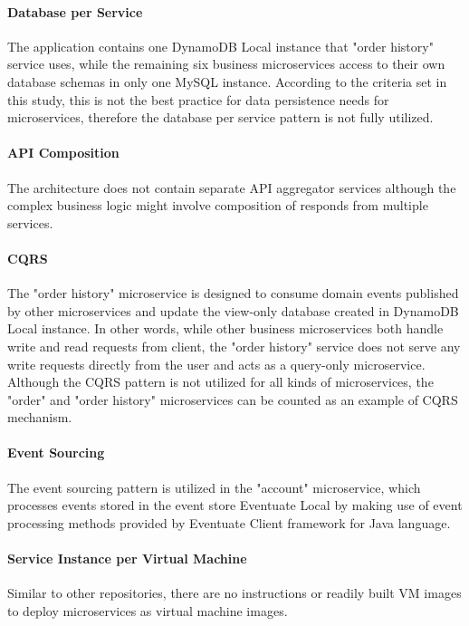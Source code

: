\documentclass{Configuration_Files/PoliMi3i_thesis}
\begin{document}
\paragraph{Database per Service} The application contains one DynamoDB Local instance that "order history" service uses, while the remaining six business microservices access to their own database schemas in only one MySQL instance.
According to the criteria set in this study, this is not the best practice for data persistence needs for microservices, therefore the database per service pattern is not fully utilized.

\paragraph{API Composition} The architecture does not contain separate API aggregator services although the complex business logic might involve composition of responds from multiple services.

\paragraph{CQRS} The "order history" microservice is designed to consume domain events published by other microservices and update the view-only database created in DynamoDB Local instance.
In other words, while other business microservices both handle write and read requests from client, the "order history" service does not serve any write requests directly from the user and acts as a query-only microservice.
Although the CQRS pattern is not utilized for all kinds of microservices, the "order" and "order history" microservices can be counted as an example of CQRS mechanism.

\paragraph{Event Sourcing} The event sourcing pattern is utilized in the "account" microservice, which processes events stored in the event store Eventuate Local by making use of event processing methods provided by Eventuate Client\footnotemark[92] framework for Java language.

\paragraph{Service Instance per Virtual Machine} Similar to other repositories, there are no instructions or readily built VM images to deploy microservices as virtual machine images.
\end{document}
